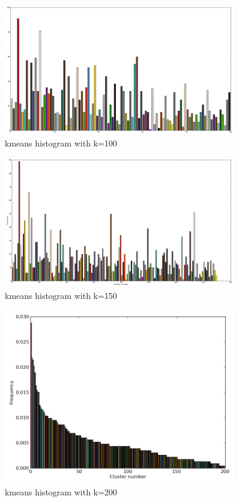 \documentclass[10pt,twocolumn,letterpaper]{article}
\begin{document}
\begin{figure}[p]
  \centering
  \includegraphics[width=0.90\textwidth]{../results/100_histogram.png}
  \caption{kmeans histogram with k=100}
  \label{k-30}
\end{figure}

\begin{figure}[p]
  \centering
  \includegraphics[width=0.90\textwidth]{../150_histogram.png}
  \caption{kmeans histogram with k=150}
  \label{k-150}
\end{figure}

\begin{figure}[p]
  \centering
  \includegraphics[width=0.90\textwidth]{../200_histogram_sorted.png}
  \caption{kmeans histogram with k=200}
  \label{k-200}
\end{figure}
\end{document}

